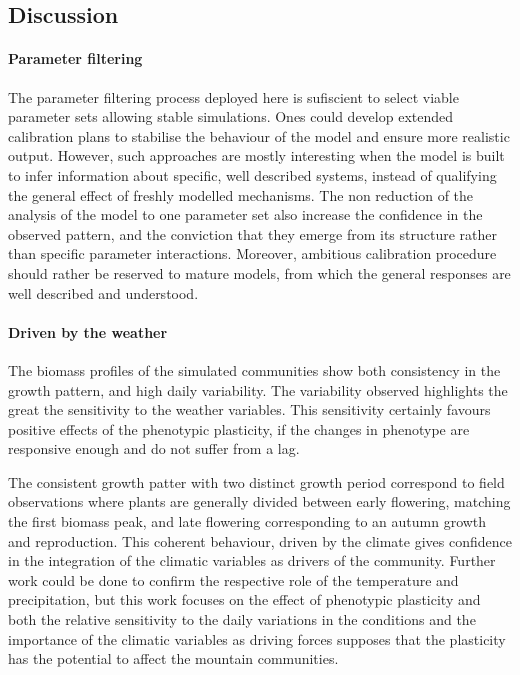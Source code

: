 \subsection{Discussion}

\paragraph{Parameter filtering}

The parameter filtering process deployed here is sufiscient to select viable parameter sets allowing stable simulations. Ones could develop extended calibration plans to stabilise the behaviour of the model and ensure more realistic output. However, such approaches are mostly interesting when the model is built to infer information about specific, well described systems, instead of qualifying the general effect of freshly modelled mechanisms. The non reduction of the analysis of the model to one parameter set also increase the confidence in the observed pattern, and the conviction that they emerge from its structure rather than specific parameter interactions. Moreover, ambitious calibration procedure should rather be reserved to mature models, from which the general responses are well described and understood.

\paragraph{Driven by the weather}

The biomass profiles of the simulated communities show both consistency in the growth pattern, and high daily variability. The variability observed highlights the great the sensitivity to the weather variables. This sensitivity certainly favours positive effects of the phenotypic plasticity, if the changes in phenotype are responsive enough and do not suffer from a lag.

The consistent growth patter with two distinct growth period correspond to field observations where plants are generally divided between early flowering, matching the first biomass peak, and late flowering corresponding to an autumn growth and reproduction. This coherent behaviour, driven by the climate gives confidence in the integration of the climatic variables as drivers of the community. Further work could be done to confirm the respective role of the temperature and precipitation, but this work focuses on the effect of phenotypic plasticity and both the relative sensitivity to the daily variations in the conditions and the importance of the climatic variables as driving forces supposes that the plasticity has the potential to affect the mountain communities.\\

